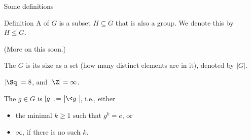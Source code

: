 \documentclass[8pt,handout]{beamer}
\newcommand{\Pause}{}      %
\begin{document}

\begin{frame}{Some definitions} %

  \begin{block}{Definition}
    A  of $G$ is a subset $H\subseteq G$ that
    is also a group. We denote this by $H\leq G$.
  \end{block}

  (More on this soon.)

  \bigskip\Pause
  
  \begin{definition}
    The  $G$ is its size as a set 
    (how many distinct elements are in it), denoted by
    $|G|$.
  \end{definition}

  \begin{example}
    $|\Sq| = 8$, and $|\Z| = \infty$.
  \end{example}

  \bigskip\Pause
  
  \begin{definition}
    The  $g\in G$ is
    $|g|:=\big|\<g\>\big|$, i.e., either \smallskip
    \begin{itemize}
    \item the minimal $k\geq 1$ such that $g^k=e$, or \smallskip
    \item $\infty$, if there is no such $k$.
    \end{itemize}
  \end{definition}
  
\end{frame}


\end{document}
